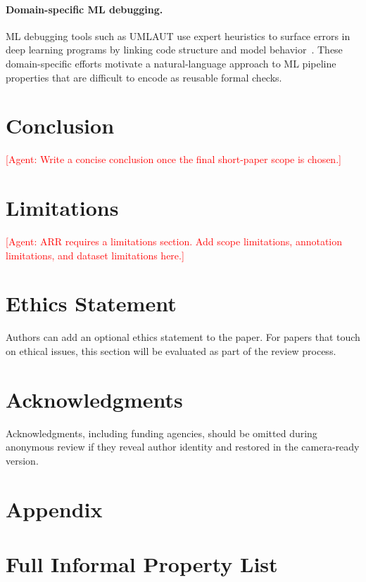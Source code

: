\documentclass[11pt]{article}
\newcommand{\agent}[1]{\textcolor{red}{[Agent: #1]}}
\begin{document}
\paragraph{Domain-specific ML debugging.}
ML debugging tools such as UMLAUT use expert heuristics to surface errors in deep learning programs by linking code structure and model behavior~\citep{schoop2021umlaut}.
These domain-specific efforts motivate a natural-language approach to ML pipeline properties that are difficult to encode as reusable formal checks.

\section{Conclusion}

\agent{Write a concise conclusion once the final short-paper scope is chosen.}

\section*{Limitations}

\agent{ARR requires a limitations section. Add scope limitations, annotation limitations, and dataset limitations here.}

\section*{Ethics Statement}

Authors can add an optional ethics statement to the paper.
For papers that touch on ethical issues, this section will be evaluated as part of the review process.

\section*{Acknowledgments}

Acknowledgments, including funding agencies, should be omitted during anonymous review if they reveal author identity and restored in the camera-ready version.




\appendix
\section{Appendix}

\section{Full Informal Property List}
\label{app:properties}
\end{document}
